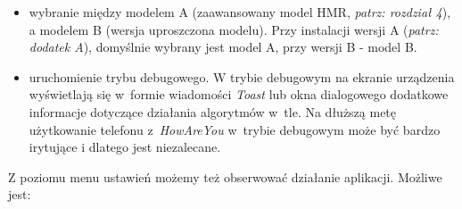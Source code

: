 \begin{itemize}
	\item wybranie między modelem A (zaawansowany model HMR, \textit{patrz: rozdział 4}), a modelem B (wersja uproszczona modelu). Przy instalacji wersji A (\textit{patrz: dodatek A}), domyślnie wybrany jest model A, przy wersji B - model B.
	
	\item uruchomienie trybu debugowego. W trybie debugowym na ekranie urządzenia wyświetlają się w~formie wiadomości \textit{Toast} lub okna dialogowego dodatkowe informacje dotyczące działania algorytmów w~tle. Na dłuższą metę użytkowanie telefonu z~\textit{HowAreYou} w~trybie debugowym może być bardzo irytujące i dlatego jest niezalecane.
	
\end{itemize}

Z poziomu menu ustawień możemy też obserwować działanie aplikacji. Możliwe jest:

